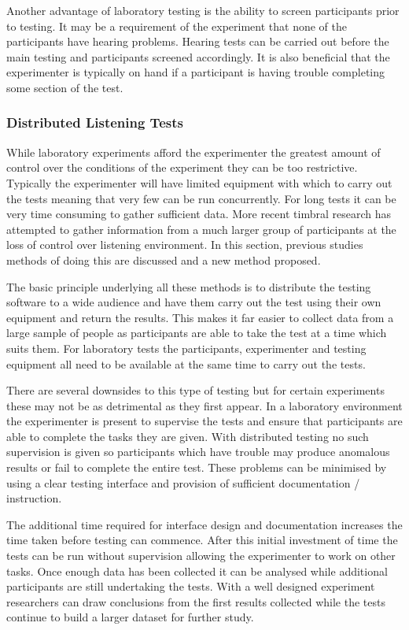 			Another advantage of laboratory testing is the ability to screen participants prior to testing. It
			may be a requirement of the experiment that none of the participants have hearing problems. Hearing
			tests can be carried out before the main testing and participants screened accordingly. It is also
			beneficial that the experimenter is typically on hand if a participant is having trouble completing
			some section of the test.

		\subsubsection*{Distributed Listening Tests}
			While laboratory experiments afford the experimenter the greatest amount of control over the
			conditions of the experiment they can be too restrictive. Typically the experimenter will have
			limited equipment with which to carry out the tests meaning that very few can be run concurrently.
			For long tests it can be very time consuming to gather sufficient data. More recent timbral
			research has attempted to gather information from a much larger group of participants at the loss
			of control over listening environment. In this section, previous studies methods of doing this are
			discussed and a new method proposed.

			The basic principle underlying all these methods is to distribute the testing software to a wide
			audience and have them carry out the test using their own equipment and return the results. This
			makes it far easier to collect data from a large sample of people as participants are able to take
			the test at a time which suits them. For laboratory tests the participants, experimenter and
			testing equipment all need to be available at the same time to carry out the tests.

			There are several downsides to this type of testing but for certain experiments these may not be as
			detrimental as they first appear. In a laboratory environment the experimenter is present to
			supervise the tests and ensure that participants are able to complete the tasks they are given.
			With distributed testing no such supervision is given so participants which have trouble may
			produce anomalous results or fail to complete the entire test. These problems can be minimised by
			using a clear testing interface and provision of sufficient documentation / instruction.

			The additional time required for interface design and documentation increases the time taken before
			testing can commence. After this initial investment of time the tests can be run without
			supervision allowing the experimenter to work on other tasks. Once enough data has been collected
			it can be analysed while additional participants are still undertaking the tests. With a well
			designed experiment researchers can draw conclusions from the first results collected while the
			tests continue to build a larger dataset for further study.

